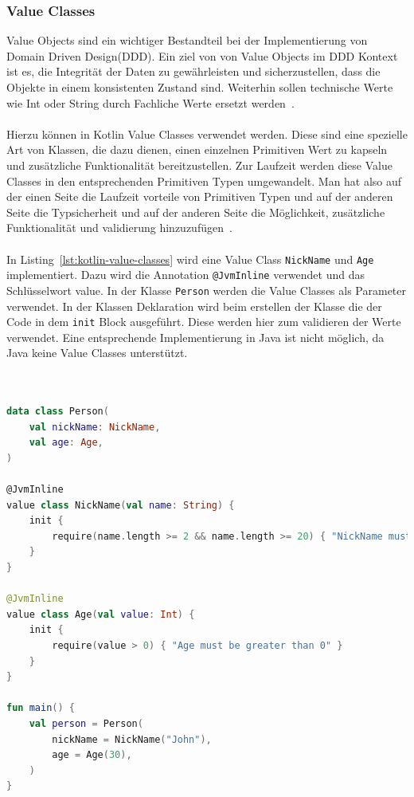\documentclass[11pt]{article}
\begin{document}
    \subsubsection{Value Classes}
    Value Objects sind ein wichtiger Bestandteil bei der Implementierung von Domain Driven Design(DDD).
    Ein ziel von von Value Objects im DDD Kontext ist es, die Integrität der Daten zu gewährleisten und sicherzustellen, dass die Objekte in einem konsistenten Zustand sind.
    Weiterhin sollen technische Werte wie Int oder String durch Fachliche Werte ersetzt werden~\cite[219]{red-book}.\\
    \\
    Hierzu können in Kotlin Value Classes verwendet werden.
    Diese sind eine spezielle Art von Klassen, die dazu dienen, einen einzelnen Primitiven Wert zu kapseln und zusätzliche Funktionalität bereitzustellen.
    Zur Laufzeit werden diese Value Classes in den entsprechenden Primitiven Typen umgewandelt.
    Man hat also auf der einen Seite die Laufzeit vorteile von Primitiven Typen und auf der anderen Seite die Typsicherheit und auf der anderen Seite die Möglichkeit, zusätzliche Funktionalität und validierung hinzuzufügen~\cite{kotlin-value-classes}.\\
    \\
    In Listing~\ref{lst:kotlin-value-classes} wird eine Value Class \texttt{NickName} und \texttt{Age} implementiert.
    Dazu wird die Annotation \texttt{@JvmInline} verwendet und das Schlüsselwort value.
    In der Klasse \texttt{Person} werden die Value Classes als Parameter verwendet.
    In der Klassen Deklaration wird beim erstellen der Klasse die der Code in dem \texttt{init} Block ausgeführt.
    Diese werden hier zum validieren der Werte verwendet.
    Eine entsprechende Implementierung in Java ist nicht möglich, da Java keine Value Classes unterstützt.\\
    \\

    \begin{lstlisting}[language=Kotlin, caption={ValueClasses.kt}, label={lst:kotlin-value-classes}]

data class Person(
    val nickName: NickName,
    val age: Age,
)

@JvmInline
value class NickName(val name: String) {
    init {
        require(name.length >= 2 && name.length >= 20) { "NickName must be between 2 and 20 Letters" }
    }
}

@JvmInline
value class Age(val value: Int) {
    init {
        require(value > 0) { "Age must be greater than 0" }
    }
}

fun main() {
    val person = Person(
        nickName = NickName("John"),
        age = Age(30),
    )
}
    \end{lstlisting}
\end{document}
